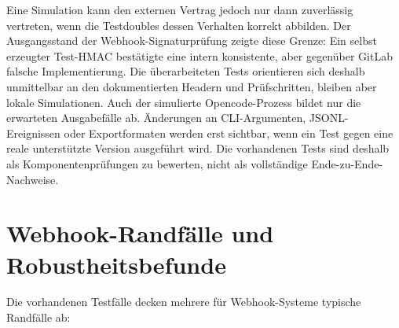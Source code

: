 Eine Simulation kann den externen Vertrag jedoch nur dann zuverlässig vertreten, wenn die Testdoubles dessen Verhalten korrekt abbilden. Der Ausgangsstand der Webhook-Signaturprüfung zeigte diese Grenze: Ein selbst erzeugter Test-HMAC bestätigte eine intern konsistente, aber gegenüber GitLab falsche Implementierung. Die überarbeiteten Tests orientieren sich deshalb unmittelbar an den dokumentierten Headern und Prüfschritten, bleiben aber lokale Simulationen. Auch der simulierte Opencode-Prozess bildet nur die erwarteten Ausgabefälle ab. Änderungen an CLI-Argumenten, JSONL-Ereignissen oder Exportformaten werden erst sichtbar, wenn ein Test gegen eine reale unterstützte Version ausgeführt wird. Die vorhandenen Tests sind deshalb als Komponentenprüfungen zu bewerten, nicht als vollständige Ende-zu-Ende-Nachweise.

\section{Webhook-Randfälle und Robustheitsbefunde}

Die vorhandenen Testfälle decken mehrere für Webhook-Systeme typische Randfälle ab:

